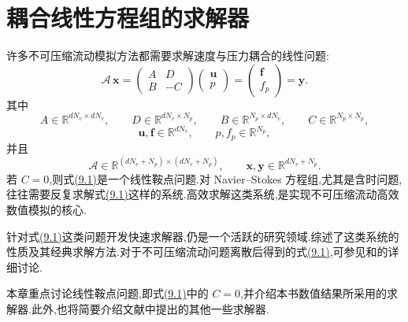 \chapter{耦合线性方程组的求解器}\label{chap:coupled-linear-solvers}

\begin{note}[动机]
\label{note:coupled-solvers-motivation}
许多不可压缩流动模拟方法都需要求解速度与压力耦合的线性问题:
\begin{equation}\label{eq:chapter9-coupled-system}
\mathcal A\,\bm{x}
=\begin{pmatrix}A&D\\B&-C\end{pmatrix}
  \begin{pmatrix}\bm{u}\\p\end{pmatrix}
=\begin{pmatrix}\bm{f}\\f_p\end{pmatrix}
=\bm{y}.
\end{equation}
其中
\[
 A\in\mathbb{R}^{dN_v\times dN_v},\qquad
 D\in\mathbb{R}^{dN_v\times N_p},\qquad
 B\in\mathbb{R}^{N_p\times dN_v},\qquad
 C\in\mathbb{R}^{N_p\times N_p},
\]
\[
 \bm{u},\bm{f}\in\mathbb{R}^{dN_v},\qquad
 p,f_p\in\mathbb{R}^{N_p},
\]
并且
\[
 \mathcal A\in\mathbb{R}^{(dN_v+N_p)\times(dN_v+N_p)},
 \qquad
 \bm{x},\bm{y}\in\mathbb{R}^{dN_v+N_p}.
\]
若 $C=0$,则式\hyperref[eq:chapter9-coupled-system]{(9.1)}是一个线性鞍点问题.对 Navier--Stokes 方程组,尤其是含时问题,往往需要反复求解式\hyperref[eq:chapter9-coupled-system]{(9.1)}这样的系统.高效求解这类系统,是实现不可压缩流动高效数值模拟的核心.
\end{note}

\begin{note}[本章内容]
\label{note:chapter9-contents}
针对式\hyperref[eq:chapter9-coupled-system]{(9.1)}这类问题开发快速求解器,仍是一个活跃的研究领域.\textcite{BenziGolubLiesen2005}综述了这类系统的性质及其经典求解方法.对于不可压缩流动问题离散后得到的式\hyperref[eq:chapter9-coupled-system]{(9.1)},可参见\textcite[第 4、9 章]{Elman2014}和\textcite[第 5.2 节]{OlshanskiiTyrtyshnikov2014}的详细讨论.

本章重点讨论线性鞍点问题,即式\hyperref[eq:chapter9-coupled-system]{(9.1)}中的 $C=0$,并介绍本书数值结果所采用的求解器.此外,也将简要介绍文献中提出的其他一些求解器.
\end{note}

